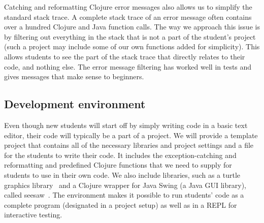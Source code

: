 \documentclass[submission,copyright,creativecommons]{eptcs}
\newcommand{\allcomments}[1]{{#1}}
\newcommand{\elenacomment}[1]{{\bf \textcolor{ForestGreen}{\allcomments{{#1}}}}}
\newcommand{\stephencomment}[1]{{\bf \color{StephensBlue}{\allcomments{{#1}}}}} %
\newcommand{\joecomment}[1]{{\bf \color{JoesGold}{\allcomments{{#1}}}}}
\newcommand{\todo}[1]{{\bf \color{magenta}{\allcomments{ To-do: {#1}}}}}
\begin{document}
Catching and reformatting Clojure error messages also allows us to simplify the standard stack trace. A complete stack trace of an error message often contains over a hundred Clojure and Java function calls. The way we approach this issue is by filtering out everything in the stack that is not a part of the student's project (such a project may include some of our own functions added for simplicity). This allows students to see the part of the stack trace that directly relates to their code, and nothing else. 
The error message filtering has worked well in tests and gives messages that make sense to beginners. %



\subsection{Development environment}\label{subsec:envt}
Even though new students will start off by simply writing code in a basic text editor, their code will typically be a part of a project.
We will provide a template project that contains all of the necessary libraries and project settings and %
a file for the students to write their code. It includes the exception-catching and reformatting and predefined Clojure functions that we need to supply for students to use in their own code. We also include libraries, such as a turtle graphics library~\cite{turtle} and a Clojure wrapper for Java Swing (a Java GUI library), called seesaw~\cite{graphics}. The environment makes it possible to run students' code as a complete program (designated in a project setup) as well as in a REPL %
for interactive testing. 
\end{document}
